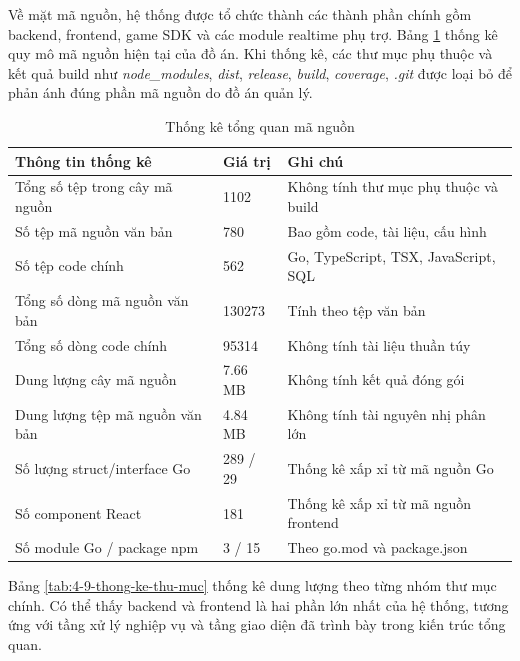 Về mặt mã nguồn, hệ thống được tổ chức thành các thành phần chính gồm backend, frontend, game SDK và các module realtime phụ trợ. Bảng \ref{tab:4-8-thong-ke-ma-nguon} thống kê quy mô mã nguồn hiện tại của đồ án. Khi thống kê, các thư mục phụ thuộc và kết quả build như \textit{node\_modules}, \textit{dist}, \textit{release}, \textit{build}, \textit{coverage}, \textit{.git} được loại bỏ để phản ánh đúng phần mã nguồn do đồ án quản lý.

\begin{table}[H]
    \centering
    \caption{Thống kê tổng quan mã nguồn}
    \label{tab:4-8-thong-ke-ma-nguon}
    \begin{tabular}{|p{}|p{}|p{}|}
        \hline
        \textbf{Thông tin thống kê} & \textbf{Giá trị} & \textbf{Ghi chú} \\ \hline
        Tổng số tệp trong cây mã nguồn & 1102 & Không tính thư mục phụ thuộc và build \\ \hline
        Số tệp mã nguồn văn bản & 780 & Bao gồm code, tài liệu, cấu hình \\ \hline
        Số tệp code chính & 562 & Go, TypeScript, TSX, JavaScript, SQL \\ \hline
        Tổng số dòng mã nguồn văn bản & 130273 & Tính theo tệp văn bản \\ \hline
        Tổng số dòng code chính & 95314 & Không tính tài liệu thuần túy \\ \hline
        Dung lượng cây mã nguồn & 7.66 MB & Không tính kết quả đóng gói \\ \hline
        Dung lượng tệp mã nguồn văn bản & 4.84 MB & Không tính tài nguyên nhị phân lớn \\ \hline
        Số lượng struct/interface Go & 289 / 29 & Thống kê xấp xỉ từ mã nguồn Go \\ \hline
        Số component React & 181 & Thống kê xấp xỉ từ mã nguồn frontend \\ \hline
        Số module Go / package npm & 3 / 15 & Theo go.mod và package.json \\ \hline
    \end{tabular}
\end{table}

Bảng \ref{tab:4-9-thong-ke-thu-muc} thống kê dung lượng theo từng nhóm thư mục chính. Có thể thấy backend và frontend là hai phần lớn nhất của hệ thống, tương ứng với tầng xử lý nghiệp vụ và tầng giao diện đã trình bày trong kiến trúc tổng quan.

